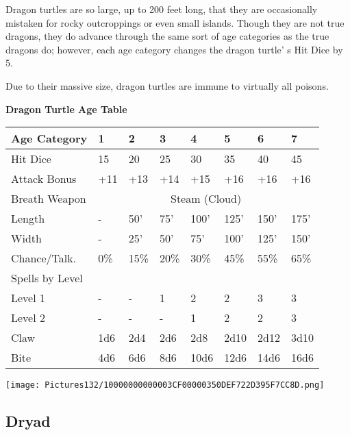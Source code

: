 \documentclass[a4paper,twoside,openany,10pt]{book}
\begin{document}
\begin{multicols}{2}
Dragon turtles are so large, up to 200 feet long, that they are occasionally mistaken for rocky outcroppings or even small islands. Though they are not true dragons, they do advance through the same sort of age categories as the true dragons do; however, each age category changes the dragon turtle' s Hit Dice by 5.

Due to their massive size, dragon turtles are immune to virtually all poisons.


\begin{center}
\textbf{Dragon Turtle Age Table}\\

\begin{tabularx}{0.47\textwidth}{@{}lXXXXXXX@{}}
Age Category & 1 & 2 & 3 & 4 & 5 & 6 & 7 \\\hline
Hit Dice & 15 & 20 & 25 & 30 & 35 & 40 & 45 \\\hline
Attack Bonus & +11 & +13 & +14 & +15 & +16 & +16 & +16 \\\hline
Breath Weapon & \multicolumn{7}{c}{Steam (Cloud)}\\\hline
Length & - & 50' & 75' & 100' & 125' & 150' & 175' \\\hline
Width & - & 25' & 50' & 75' & 100' & 125' & 150' \\\hline 
Chance/Talk. & 0\% & 15\% & 20\% & 30\% & 45\% & 55\% & 65\% \\\hline
Spells by Level & & & & & & & \\\hline
Level 1 & - & - & 1 & 2 & 2 & 3 & 3 \\\hline
Level 2 & - & - & - & 1 & 2 & 2 & 3 \\\hline
Claw & 1d6 & 2d4 & 2d6 & 2d8 & 2d10 & 2d12 & 3d10 \\\hline
Bite & 4d6 & 6d6 & 8d6 & 10d6 & 12d6 & 14d6 & 16d6 \\\hline
\end{tabularx}
\end{center}


\begin{center}
	\texttt{[image: Pictures132/10000000000003CF00000350DEF722D395F7CC8D.png]}	
\end{center}

\columnbreak

\subsection*{Dryad}\label{dryad}


\end{multicols}
\end{document}
